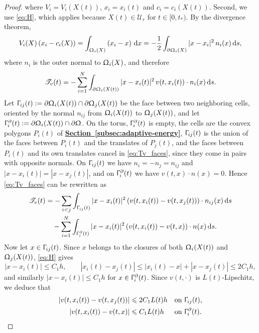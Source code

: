 \documentclass[letterpaper,11pt,twoside]{article}
\numberwithin{figure}{section}
\numberwithin{table}{section}
\theoremstyle{cpamplain}
\theoremstyle{cpamdefinition}
\newcommand{\diff}{\mathrm{d}}
\newcommand{\Secref}[1]{\textbf{\hyperref[#1]{Section~\ref*{#1}}}}
\let\Gamma\Upgamma
\let\Omega\Upomega
\renewcommand{\le}{\leqslant}
\numberwithin{equation}{section}
\begin{document}
\begin{proof}
where $V_i=V_i(X(t))$, $x_i=x_i(t)$ and $c_i=c_i(X(t))$. Second, we use \eqref{eq:H}, which applies because $X(t)\in\mathcal U_r$ for $t\in[0,t_\ast)$.
By the divergence theorem,
\[
V_i(X)\left(x_i-c_i(X)\right)=\int_{\Omega_i(X)} \left(x_i-x\right)\,\diff x
=-\frac12\int_{\partial\Omega_i(X)}|x-x_i|^2\,n_i(x)\,\diff s,
\]
where $n_i$ is the outer normal to $\Omega_i(X)$, and therefore
\begin{equation}\label{eq:Tv_faces}
\mathscr T_v(t)=-\sum_{i=1}^N\int_{\partial\Omega_i(X(t))}|x-x_i(t)|^2\,v(t,x_i(t))\cdot n_i(x)\,\diff s .
\end{equation}
Let $\Gamma_{ij}(t):=\partial\Omega_i(X(t))\cap\partial\Omega_j(X(t))$ be the face between two neighboring cells, oriented by the normal $n_{ij}$ from $\Omega_i(X(t))$ to $\Omega_j(X(t))$, and let $\Gamma_i^\partial(t):=\partial\Omega_i(X(t))\cap\partial\Omega$.
On the torus, $\Gamma_i^\partial(t)$ is empty, the cells are the convex polygons $P_i(t)$ of \Secref{subsec:adaptive-energy}, $\Gamma_{ij}(t)$ is the union of the faces between $P_i(t)$ and the translates of $P_j(t)$, and the faces between $P_i(t)$ and its own translates cancel in \eqref{eq:Tv_faces}, since they come in pairs with opposite normals.
On $\Gamma_{ij}(t)$ we have $n_i=-n_j=n_{ij}$ and $|x-x_i(t)|=|x-x_j(t)|$, and on $\Gamma_i^\partial(t)$ we have $v(t,x)\cdot n(x)=0$.
Hence \eqref{eq:Tv_faces} can be rewritten as
\begin{equation}\label{eq:Tv_faces2}
\begin{aligned}
\mathscr T_v(t)
&=-\sum_{i<j}\int_{\Gamma_{ij}(t)} |x-x_i(t)|^2\left(v(t,x_i(t))-v(t,x_j(t))\right)\cdot n_{ij}(x)\,\diff s\\
&\quad-\sum_{i=1}^N\int_{\Gamma_i^\partial(t)} |x-x_i(t)|^2\left(v(t,x_i(t))-v(t,x)\right)\cdot n(x)\,\diff s .
\end{aligned}
\end{equation}
Now let $x\in\Gamma_{ij}(t)$. Since $x$ belongs to the closures of both $\Omega_i(X(t))$ and $\Omega_j(X(t))$, \eqref{eq:H} gives
\[
|x-x_i(t)|\le C_1h,
\qquad
|x_i(t)-x_j(t)|\le|x_i(t)-x|+|x-x_j(t)|\le2C_1h,
\]
and similarly $|x-x_i(t)|\le C_1h$ for $x\in\Gamma_i^\partial(t)$.
Since $v(t,\cdot)$ is $L(t)$-Lipschitz, we deduce that
\begin{equation}\label{eq:v_faces}
\begin{aligned}
\left|v(t,x_i(t))-v(t,x_j(t))\right|&\le 2C_1L(t)h
&&\text{on }\Gamma_{ij}(t),\\
\left|v(t,x_i(t))-v(t,x)\right|&\le C_1L(t)h
&&\text{on }\Gamma_i^\partial(t).

\end{aligned}
\end{equation}
\end{proof}
\end{document}
